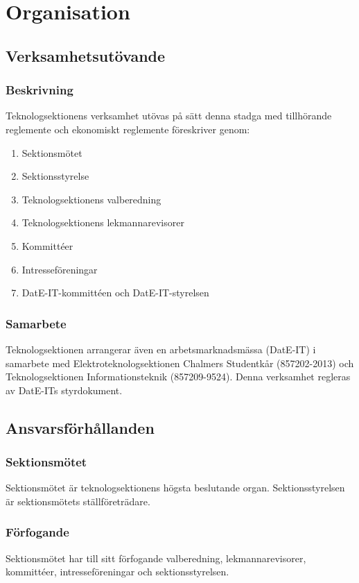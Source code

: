 \section{Organisation}
\subsection{Verksamhetsutövande}
\subsubsection{Beskrivning}
Teknologsektionens verksamhet utövas på sätt denna stadga med tillhörande reglemente och ekonomiskt reglemente föreskriver genom:
\begin{enumerate}
\item Sektionsmötet
\item Sektionsstyrelse
\item Teknologsektionens valberedning
\item Teknologsektionens lekmannarevisorer
\item Kommittéer
\item Intresseföreningar
\item DatE-IT-kommittéen och DatE-IT-styrelsen
\end{enumerate}

\subsubsection{Samarbete}
Teknologsektionen arrangerar även en arbetsmarknadsmässa (DatE-IT) i samarbete med Elektroteknologsektionen Chalmers Studentkår (857202-2013) och Teknologsektionen Informationsteknik (857209-9524). Denna verksamhet regleras av DatE-ITs styrdokument. 
  
\subsection{Ansvarsförhållanden}
\subsubsection{Sektionsmötet}
Sektionsmötet är teknologsektionens högsta beslutande organ. Sektionsstyrelsen är sektionsmötets ställföreträdare.
\subsubsection{Förfogande}
Sektionsmötet har till sitt förfogande valberedning, lekmannarevisorer, kommittéer, intresseföreningar och sektionsstyrelsen.

